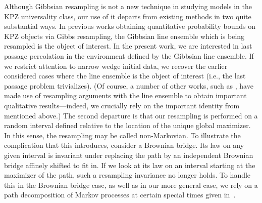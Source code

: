 \documentclass[oneside,final,11pt]{amsart}
\theoremstyle{definition}
\newcommand{\fh}{\mathfrak{h}}
\newcommand{\TPno}{\mathsf{TP}}
\newcommand{\CT}{\mathcal{T}}
\newcommand{\1}[1]{\mathbf{1}_{#1}}
\newcommand{\eps}{\varepsilon}
\let\emptyset\varnothing
\numberwithin{equation}{section}
\begin{document}
Although Gibbsian resampling is not a new technique in studying models in the KPZ universality class, our use of it departs from existing methods in two quite substantial ways. In previous works obtaining quantitative probability bounds on KPZ objects via Gibbs resampling, the Gibbsian line ensemble which is being resampled is the object of interest. 
In the present work, we are interested in last passage percolation in the environment defined by the Gibbsian line ensemble. If we restrict attention to narrow wedge initial data, we recover the earlier considered cases where the line ensemble is the object of interest (i.e., the last passage problem trivializes). (Of course, a number of other works, such as \cite{Landscape}, have made use of resampling arguments with the line ensemble to obtain important qualitative results---indeed, we crucially rely on the important identity from \cite{Landscape} mentioned above.) The second departure is that our resampling is performed on a random interval defined relative to the location of the unique global maximizer. In this sense, the resampling may be called non-Markovian. To illustrate the complication that this introduces, consider a Brownian bridge. Its law on any given interval is invariant under replacing the path by an independent Brownian bridge affinely shifted to fit in. If we look at its law on an interval starting at the maximizer of the path, such a resampling invariance no longer holds. To handle this in the Brownian bridge case, as well as in our more general case, we rely on a path decomposition of Markov processes at certain special times given in~\cite{millar1978path}.

\end{document}
